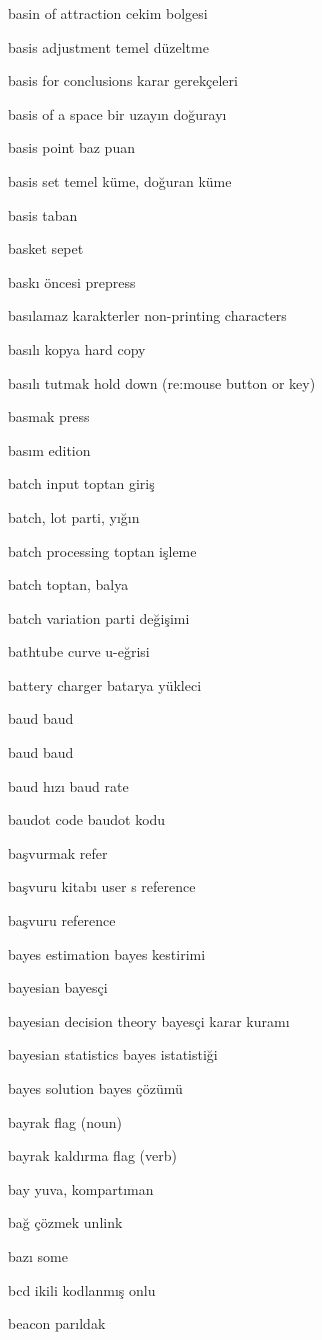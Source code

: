 \documentclass[12pt,fleqn]{article}\usepackage{../../common}
\begin{document}
basin of attraction cekim bolgesi

basis adjustment temel düzeltme

basis for conclusions karar gerekçeleri

basis of a space bir uzayın doğurayı

basis point baz puan

basis set temel küme, doğuran küme

basis taban

basket sepet

baskı öncesi prepress

basılamaz karakterler non-printing characters

basılı kopya hard copy

basılı tutmak hold down (re:mouse button or key)

basmak press

basım edition

batch input toptan giriş

batch, lot parti, yığın

batch processing toptan işleme

batch toptan, balya

batch variation parti değişimi

bathtube curve u-eğrisi

battery charger batarya yükleci

baud baud

baud baud

baud hızı baud rate

baudot code baudot kodu

başvurmak refer

başvuru kitabı user s reference

başvuru reference

bayes estimation bayes kestirimi

bayesian bayesçi

bayesian decision theory bayesçi karar kuramı

bayesian statistics bayes istatistiği

bayes solution bayes çözümü

bayrak flag (noun)

bayrak kaldırma flag (verb)

bay yuva, kompartıman

bağ çözmek unlink

bazı some

bcd ikili kodlanmış onlu

beacon parıldak
\end{document}
